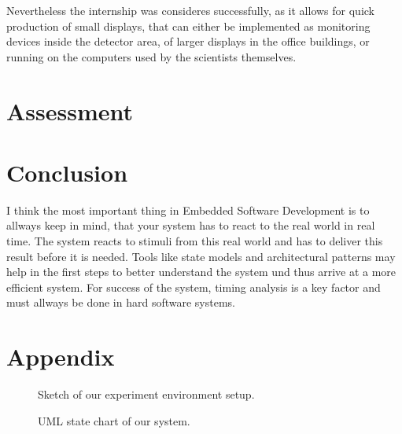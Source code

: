 \documentclass[10pt,a4paper,titlepage,draft]{article} %
\newcommand{\red}[1]
{\textcolor{red}{#1}}
\begin{document}
Nevertheless the internship was consideres successfully, as it allows for quick production of small displays, that can either be implemented as monitoring devices inside the detector area, of larger displays in the office buildings, or running on the computers used by the scientists themselves.

\section{Assessment}
\marginpar{\red{our OWN (critical) assessment of the merit of the work}}
\section{Conclusion}
I think the most important thing in Embedded Software Development is to allways keep in mind, that your system has to react to the real world in real time. The system reacts to stimuli from this real world and has to deliver this result before it is needed. Tools like state models and architectural patterns may help in the first steps to better understand the system und thus arrive at a more efficient system. For success of the system, timing analysis is a key factor and must allways be done in hard software systems.





\cleardoublepage
\appendix
\section{Appendix}

\begin{figure}[h]
\centering

\caption{Sketch of our experiment environment setup.}
\label{fig:radWarner}
\end{figure}

\begin{figure}[h]
\centering
\scalebox{.7}{}
\caption{UML state chart of our system.}
\label{fig:radState}
\end{figure}
\end{document}
